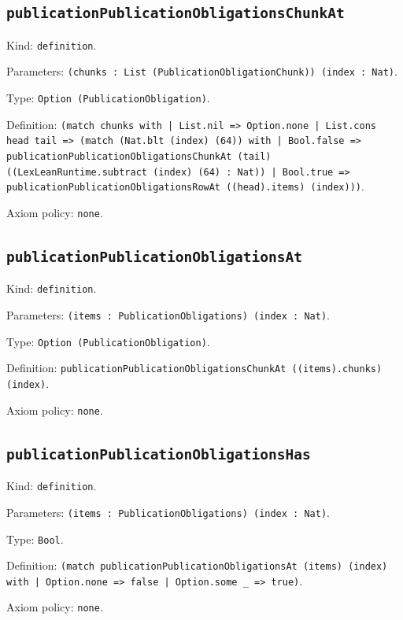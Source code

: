 \documentclass[11pt]{article}
\begin{document}
\subsection*{\texttt{publicationPublicationObligationsChunkAt}}
\noindent Kind: \texttt{definition}.\par
\noindent Parameters: \texttt{(chunks : List (PublicationObligationChunk)) (index : Nat)}.\par
\noindent Type: \texttt{Option (PublicationObligation)}.\par
\noindent Definition: \texttt{(match chunks with | List.nil => Option.none | List.cons head tail => (match (Nat.blt (index) (64)) with | Bool.false => publicationPublicationObligationsChunkAt (tail) ((LexLeanRuntime.subtract (index) (64) : Nat)) | Bool.true => publicationPublicationObligationsRowAt ((head).items) (index)))}.\par
\noindent Axiom policy: \texttt{none}.\par
\subsection*{\texttt{publicationPublicationObligationsAt}}
\noindent Kind: \texttt{definition}.\par
\noindent Parameters: \texttt{(items : PublicationObligations) (index : Nat)}.\par
\noindent Type: \texttt{Option (PublicationObligation)}.\par
\noindent Definition: \texttt{publicationPublicationObligationsChunkAt ((items).chunks) (index)}.\par
\noindent Axiom policy: \texttt{none}.\par
\subsection*{\texttt{publicationPublicationObligationsHas}}
\noindent Kind: \texttt{definition}.\par
\noindent Parameters: \texttt{(items : PublicationObligations) (index : Nat)}.\par
\noindent Type: \texttt{Bool}.\par
\noindent Definition: \texttt{(match publicationPublicationObligationsAt (items) (index) with | Option.none => false | Option.some \_ => true)}.\par
\noindent Axiom policy: \texttt{none}.\par
\end{document}
